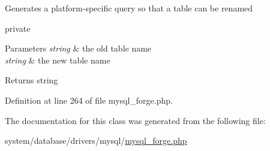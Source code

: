 Generates a platform-\/specific query so that a table can be renamed

private 
\begin{DoxyParams}{Parameters}
{\em string} & the old table name \\
\hline
{\em string} & the new table name \\
\hline
\end{DoxyParams}
\begin{DoxyReturn}{Returns}
string 
\end{DoxyReturn}


Definition at line 264 of file mysql\-\_\-forge.\-php.



The documentation for this class was generated from the following file\-:\begin{DoxyCompactItemize}
\item 
system/database/drivers/mysql/\hyperlink{mysql__forge_8php}{mysql\-\_\-forge.\-php}\end{DoxyCompactItemize}
